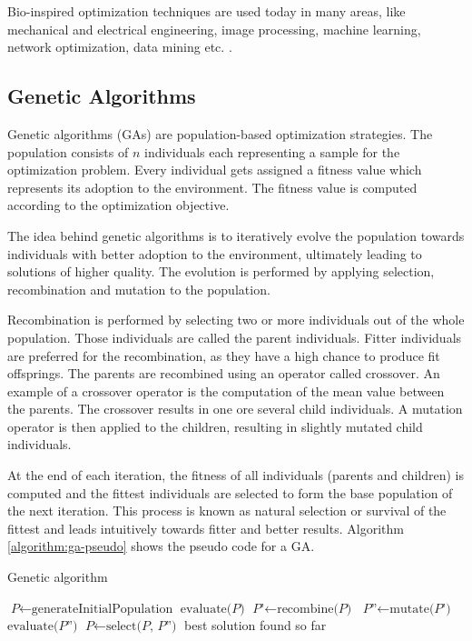 Bio-inspired optimization techniques are used today in many areas, like mechanical and electrical engineering, image processing, machine learning, network optimization, data mining etc. \cite{sivanandam2008genetic}.

\subsection{Genetic Algorithms}
\label{chap:bioalgorithms:ga}
Genetic algorithms (GAs) are population-based optimization strategies. The population consists of $n$ individuals each representing a sample for the optimization problem. Every individual gets assigned a fitness value which represents its adoption to the environment. The fitness value is computed according to the optimization objective.

The idea behind genetic algorithms is to iteratively evolve the population towards individuals with better adoption to the environment, ultimately leading to solutions of higher quality. The evolution is performed by applying selection, recombination and mutation to the population.

Recombination is performed by selecting two or more individuals out of the whole population. Those individuals are called the parent individuals. Fitter individuals are preferred for the recombination, as they have a high chance to produce fit offsprings. The parents are recombined using an operator called crossover. An example of a crossover operator is the computation of the mean value between the parents. The crossover results in one ore several child individuals. A mutation operator is then applied to the children, resulting in slightly mutated child individuals.


At the end of each iteration, the fitness of all individuals (parents and children) is computed and the fittest individuals are selected to form the base population of the next iteration. This process is known as natural selection or survival of the fittest and leads intuitively towards fitter and better results. Algorithm \ref{algorithm:ga-pseudo} shows the pseudo code for a GA.

\begin{algorithm}
  \caption{Genetic algorithm}\label{algorithm:ga-pseudo}
  \begin{algorithmic}[1]
  \State $\textit{P} \gets \text{generateInitialPopulation}$
  \State $\text{evaluate(} \textit{P} \text{)}$
    \State $\textit{P'} \gets \text{recombine(} \textit{P} \text{)}$
    \State $\textit{P''} \gets \text{mutate(} \textit{P'} \text{)}$
    \State $\text{evaluate(} \textit{P''} \text{)}$
    \State $\textit{P} \gets \text{select(} \textit{P, P''} \text{)}$
  \EndWhile
  \Return best solution found so far
  \EndProcedure
  \end{algorithmic}
\end{algorithm}

